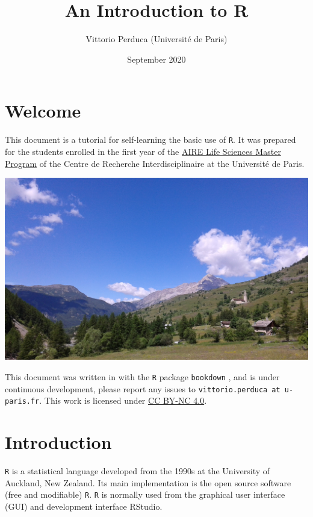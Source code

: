 \documentclass[]{book}
\title{An Introduction to R}
\author{Vittorio Perduca (Université de Paris)}
\date{September 2020}
\begin{document}
\maketitle

{
\setcounter{tocdepth}{1}
\tableofcontents
}
\hypertarget{welcome}{%
\chapter{Welcome}\label{welcome}}

This document is a tutorial for self-learning the basic use of \texttt{R}. It was prepared for the students enrolled in the first year of the \href{https://www.cri-paris.org/en/education\#04._aire-master}{AIRE Life Sciences Master Program} of the Centre de Recherche Interdisciplinaire at the Université de Paris.

\begin{center}\includegraphics[width=0.9\linewidth]{images/san-restituto} \end{center}

This document was written in with the \texttt{R} package \texttt{bookdown} \citep{R-bookdown}, \citep{bookdown2016} and is under continuous development, please report any issues to \texttt{vittorio.perduca\ at\ u-paris.fr}. This work is licensed under \href{https://creativecommons.org/licenses/by-nc/4.0/}{CC BY-NC 4.0}.

\hypertarget{introduction}{%
\chapter{Introduction}\label{introduction}}

\texttt{R} is a statistical language developed from the 1990s at the University of Auckland, New Zealand. Its main implementation is the open source software (free and modifiable) \texttt{R}. \texttt{R} is normally used from the graphical user interface (GUI) and development interface RStudio.
\end{document}
